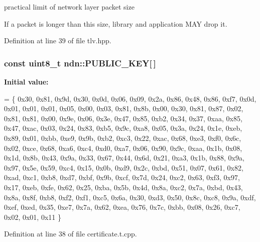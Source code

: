 \begin{DoxyVerb}
practical limit of network layer packet size 

If a packet is longer than this size, library and application M\+AY drop it. 

Definition at line 39 of file tlv.\+hpp.

\subsubsection[{\texorpdfstring{P\+U\+B\+L\+I\+C\+\_\+\+K\+EY}{PUBLIC\_KEY}}]{\setlength{\rightskip}{0pt plus 5cm}const uint8\+\_\+t ndn\+::\+P\+U\+B\+L\+I\+C\+\_\+\+K\+EY\mbox{[}$\,$\mbox{]}}\hypertarget{namespacendn_a718a2b8b4ffbe50605f8013a6e35f370}{}\label{namespacendn_a718a2b8b4ffbe50605f8013a6e35f370}
{\bfseries Initial value\+:}
\begin{DoxyCode}
= \{
0x30, 0x81, 0x9d, 0x30, 0x0d, 0x06, 0x09, 0x2a, 0x86, 0x48, 0x86, 0xf7, 0x0d, 0x01, 0x01,
0x01, 0x05, 0x00, 0x03, 0x81, 0x8b, 0x00, 0x30, 0x81, 0x87, 0x02, 0x81, 0x81, 0x00, 0x9e,
0x06, 0x3e, 0x47, 0x85, 0xb2, 0x34, 0x37, 0xaa, 0x85, 0x47, 0xac, 0x03, 0x24, 0x83, 0xb5,
0x9c, 0xa8, 0x05, 0x3a, 0x24, 0x1e, 0xeb, 0x89, 0x01, 0xbb, 0xe9, 0x9b, 0xb2, 0xc3, 0x22,
0xac, 0x68, 0xe3, 0xf0, 0x6c, 0x02, 0xce, 0x68, 0xa6, 0xc4, 0xd0, 0xa7, 0x06, 0x90, 0x9c,
0xaa, 0x1b, 0x08, 0x1d, 0x8b, 0x43, 0x9a, 0x33, 0x67, 0x44, 0x6d, 0x21, 0xa3, 0x1b, 0x88,
0x9a, 0x97, 0x5e, 0x59, 0xc4, 0x15, 0x0b, 0xd9, 0x2c, 0xbd, 0x51, 0x07, 0x61, 0x82, 0xad,
0xc1, 0xb8, 0xd7, 0xbf, 0x9b, 0xcf, 0x7d, 0x24, 0xc2, 0x63, 0xf3, 0x97, 0x17, 0xeb, 0xfe,
0x62, 0x25, 0xba, 0x5b, 0x4d, 0x8a, 0xc2, 0x7a, 0xbd, 0x43, 0x8a, 0x8f, 0xb8, 0xf2, 0xf1,
0xc5, 0x6a, 0x30, 0xd3, 0x50, 0x8c, 0xc8, 0x9a, 0xdf, 0xef, 0xed, 0x35, 0xe7, 0x7a, 0x62,
0xea, 0x76, 0x7c, 0xbb, 0x08, 0x26, 0xc7, 0x02, 0x01, 0x11
\}
\end{DoxyCode}


Definition at line 38 of file certificate.\+t.\+cpp.


\end{DoxyVerb}
